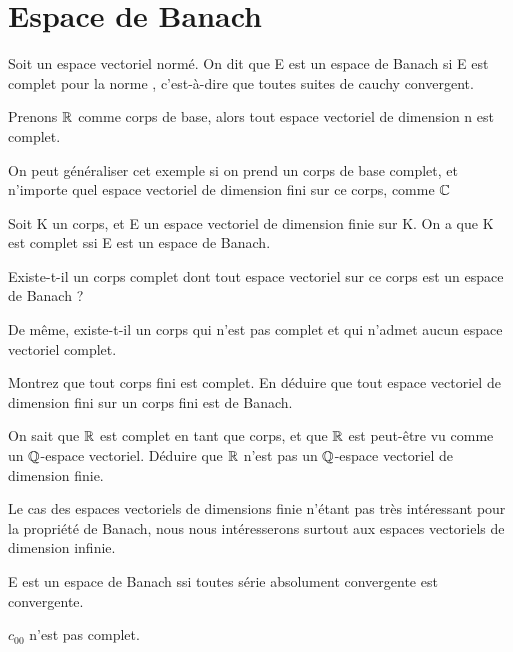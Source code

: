 \section{Espace de Banach}

\begin{definition} 
	Soit  un espace vectoriel normé. On dit que E
	est un espace de Banach si E est complet pour la norme ,
	c'est-à-dire que toutes suites de cauchy convergent.
\end{definition}

Prenons $\mathbb{R}$ comme corps de base, alors tout espace vectoriel de dimension n
est complet.

On peut généraliser cet exemple si on prend un corps de base complet, et
n'importe quel espace vectoriel de dimension fini sur ce corps, comme $\mathbb{C}$

\begin{proposition}
	Soit K un corps, et E un espace vectoriel de dimension finie sur K. On a que
	K est complet ssi E est un espace de Banach.
\end{proposition}

\begin{question}
	Existe-t-il un corps complet dont tout espace vectoriel sur ce corps est un
	espace de Banach ?

	De même, existe-t-il un corps qui n'est pas complet et qui n'admet aucun
	espace vectoriel complet.
\end{question}

\begin{exercice}
	Montrez que tout corps fini est complet. En déduire que tout espace
	vectoriel de dimension fini sur un corps fini est de Banach.
\end{exercice}

\begin{exercice}
	On sait que $\mathbb{R}$ est complet en tant que corps, et que $\mathbb{R}$ est
	peut-être vu comme un $\mathbb{Q}$-espace vectoriel. Déduire que $\mathbb{R}$
	n'est pas un $\mathbb{Q}$-espace vectoriel de dimension finie.
\end{exercice}

Le cas des espaces vectoriels de dimensions finie n'étant pas très intéressant
pour la propriété de Banach, nous nous intéresserons surtout aux espaces
vectoriels de dimension infinie.

\begin{proposition}
	E est un espace de Banach ssi toutes série absolument convergente
	est convergente.
\end{proposition}

\begin{exemple}
	$c_{00}$ n'est pas complet.
\end{exemple}
